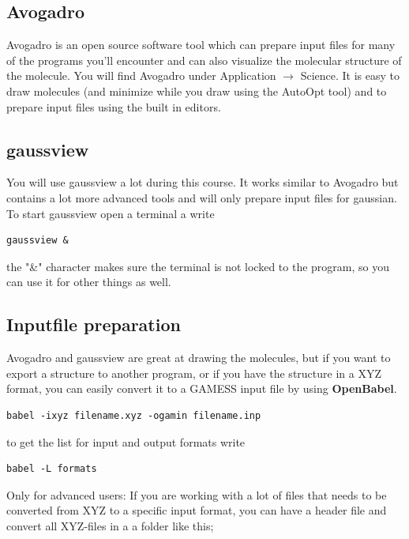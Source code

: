 \documentclass{article}
\begin{document}
\subsection*{Avogadro}

Avogadro is an open source software tool which can prepare input files for many of the programs you'll encounter and can also visualize the molecular structure of the molecule.
You will find Avogadro under Application $\rightarrow$ Science.
It is easy to draw molecules (and minimize while you draw using the AutoOpt tool) and to prepare input files using the built in editors.

\subsection*{gaussview}

You will use gaussview a lot during this course.
It works similar to Avogadro but contains a lot more advanced tools and will only prepare input files for gaussian.
To start gaussview open a terminal a write
\begin{lstlisting}
gaussview &
\end{lstlisting}

the "\&" character makes sure the terminal is not locked to the program, so you can use it for other things as well.


\subsection*{Inputfile preparation}

Avogadro and gaussview are great at drawing the molecules, but if you want to export a structure to another program, or if you have the structure in a XYZ format, you can easily convert it to a GAMESS input file by using {\bf OpenBabel}.

\begin{lstlisting}
babel -ixyz filename.xyz -ogamin filename.inp
\end{lstlisting}

to get the list for input and output formats write

\begin{lstlisting}
babel -L formats
\end{lstlisting}

Only for advanced users: If you are working with a lot of files that needs to be converted from XYZ to a specific input format, you can have a header file  and convert all XYZ-files in a a folder like this;
\end{document}
